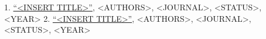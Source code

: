 


\begin{cvskills}

\cvskill
{1.}
{\href{https://doi.org/10.1016/j.rser.2012.04.046}{``<INSERT TITLE>''}, <AUTHORS>, <JOURNAL>, <STATUS>, <YEAR> }
\cvskill
{2.}
{\href{https://doi.org/10.1016/j.rser.2012.04.046}{``<INSERT TITLE>''}, <AUTHORS>, <JOURNAL>, <STATUS>, <YEAR> }
\end{cvskills}